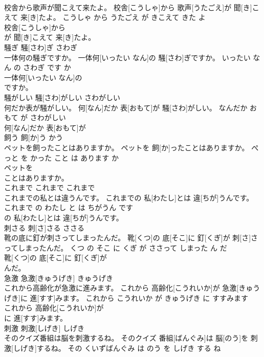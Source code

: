 \documentclass[8pt]{extreport}
\begin{document}
\begin{CJK}{UTF8}{min}
\\	校舎から歌声が聞こえて来たよ。	校舎[こうしゃ]から 歌声[うたごえ]が 聞[き]こえて 来[き]たよ。	こうしゃ から うたごえ が きこえて きた よ	
\\	校舎[こうしゃ]から
\\	が 聞[き]こえて 来[き]たよ。			
\\	騒ぎ	騒[さわ]ぎ	さわぎ	
\\	一体何の騒ぎですか。	一体何[いったい なん]の 騒[さわ]ぎですか。	いったい なん の さわぎ です か	
\\	一体何[いったい なん]の
\\	ですか。			
\\	騒がしい	騒[さわ]がしい	さわがしい	
\\	何だか表が騒がしい。	何[なん]だか 表[おもて]が 騒[さわ]がしい。	なんだか おもて が さわがしい	
\\	何[なん]だか 表[おもて]が
\\	飼う	飼[か]う	かう	
\\	ペットを飼ったことはありますか。	ペットを 飼[か]ったことはありますか。	ぺっと を かった こと は あります か	
\\	ペットを
\\	ことはありますか。			
\\	これまで	これまで	これまで	
\\	これまでの私とは違うんです。	これまでの 私[わたし]とは 違[ちが]うんです。	これまで の わたし と は ちがうん です	
\\	の 私[わたし]とは 違[ちが]うんです。			
\\	刺さる	刺[さ]さる	ささる	
\\	靴の底に釘が刺さってしまったんだ。	靴[くつ]の 底[そこ]に 釘[くぎ]が 刺[さ]さってしまったんだ。	くつ の そこ に くぎ が ささって しまった ん だ	
\\	靴[くつ]の 底[そこ]に 釘[くぎ]が
\\	んだ。			
\\	急激	急激[きゅうげき]	きゅうげき	
\\	これから高齢化が急激に進みます。	これから 高齢化[こうれいか]が 急激[きゅうげき]に 進[すす]みます。	これから こうれいか が きゅうげき に すすみます	
\\	これから 高齢化[こうれいか]が
\\	に 進[すす]みます。			
\\	刺激	刺激[しげき]	しげき	
\\	そのクイズ番組は脳を刺激するね。	そのクイズ 番組[ばんぐみ]は 脳[のう]を 刺激[しげき]するね。	その くいずばんぐみ は のう を しげき する ね	

\end{CJK}
\end{document}
